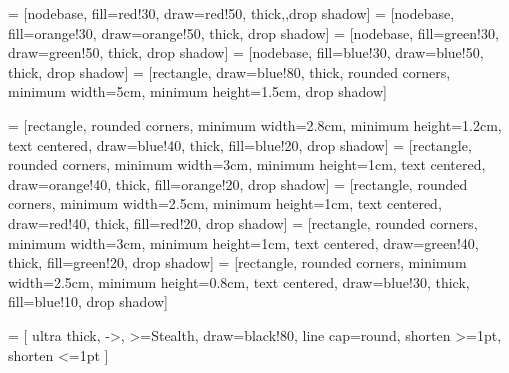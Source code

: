 
 = [nodebase, fill=red!30, draw=red!50, thick,,drop shadow]
 = [nodebase, fill=orange!30, draw=orange!50, thick, drop shadow]
 = [nodebase, fill=green!30, draw=green!50, thick, drop shadow]
 = [nodebase, fill=blue!30, draw=blue!50, thick, drop shadow]
 = [rectangle, draw=blue!80, thick, rounded corners, minimum width=5cm, minimum height=1.5cm, drop shadow]

 = [rectangle, rounded corners, minimum width=2.8cm, minimum height=1.2cm, text centered, draw=blue!40, thick, fill=blue!20, drop shadow]
 = [rectangle, rounded corners, minimum width=3cm, minimum height=1cm, text centered, draw=orange!40, thick, fill=orange!20, drop shadow]
 = [rectangle, rounded corners, minimum width=2.5cm, minimum height=1cm, text centered, draw=red!40, thick, fill=red!20, drop shadow]
 = [rectangle, rounded corners, minimum width=3cm, minimum height=1cm, text centered, draw=green!40, thick, fill=green!20, drop shadow]
 = [rectangle, rounded corners, minimum width=2.5cm, minimum height=0.8cm, text centered, draw=blue!30, thick, fill=blue!10, drop shadow]

 = [
    ultra thick,       %
    ->,               %
    >=Stealth,       %
    draw=black!80,    %
    line cap=round,   %
    shorten >=1pt,    %
    shorten <=1pt     %
]

